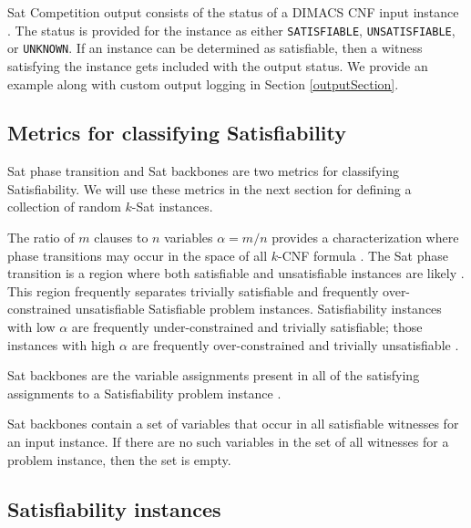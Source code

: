 
{\sc Sat} Competition output consists of the status of a DIMACS CNF input instance \cite{satcompetition}.  The status is provided for the instance as either \texttt{SATISFIABLE}, \texttt{UNSATISFIABLE}, or \texttt{UNKNOWN}.  If an instance can be determined as satisfiable, then a witness satisfying the instance gets included with the output status.  We provide an example along with custom output logging in Section \ref{outputSection}.
	
	\subsection{Metrics for classifying {\sc Satisfiability}}

{\sc Sat} phase transition and {\sc Sat} backbones are two metrics for classifying {\sc Satisfiability}.  We will use these metrics in the next section for defining a collection of random $k$-{\sc Sat} instances.
		


The ratio of $m$ clauses to $n$ variables $\alpha = m/n$ provides a characterization where phase transitions may occur in the space of all $k$-CNF formula \cite{Doherty08thehandbook,Gent94thesat}.  The {\sc Sat} phase transition is a region where both satisfiable and unsatisfiable instances are likely \cite{Gent94thesat}.  This region frequently separates trivially satisfiable and frequently over-constrained unsatisfiable {\sc Satisfiable} problem instances.  {\sc Satisfiability} instances with low $\alpha$ are frequently under-constrained and trivially satisfiable; those instances with high $\alpha$ are frequently over-constrained and trivially unsatisfiable \cite{Gent94thesat}.
		
\begin{definition}
{\sc Sat} backbones are the variable assignments present in all of the satisfying assignments to a {\sc Satisfiability} problem instance \cite{Zhang2001}. 

\end{definition}

{\sc Sat} backbones contain a set of variables that occur in all satisfiable witnesses for an input instance.  If there are no such variables in the set of all witnesses for a problem instance, then the set is empty.

	\subsection{{\sc Satisfiability} instances}
		
